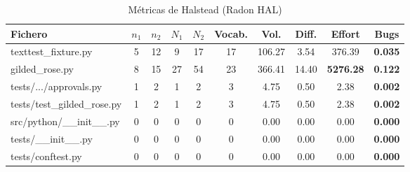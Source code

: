 \documentclass{article}
\newcommand{\good}[1]{\textbf{\textcolor{metGood}{#1}}}
\newcommand{\medium}[1]{\textbf{\textcolor{metMedium}{#1}}}
\newcommand{\bad}[1]{\textbf{\textcolor{metBad}{#1}}}
\begin{document}
\begin{table}[H]
    \centering
    \small
    \setlength{\tabcolsep}{4pt}
    \begin{tabular}{lcccccccc c}
        \toprule
        \textbf{Fichero}            & \textbf{$n_1$} & \textbf{$n_2$} & \textbf{$N_1$} & \textbf{$N_2$} & \textbf{Vocab.} & \textbf{Vol.} & \textbf{Diff.} & \textbf{Effort} & \textbf{Bugs}  \\
        \midrule
        texttest\_fixture.py        & 5              & 12             & 9              & 17             & 17              & 106.27        & 3.54           & 376.39          & \good{0.035}   \\
        gilded\_rose.py             & 8              & 15             & 27             & 54             & 23              & 366.41        & 14.40          & \bad{5276.28}   & \medium{0.122} \\
        tests/.../approvals.py      & 1              & 2              & 1              & 2              & 3               & 4.75          & 0.50           & 2.38            & \good{0.002}   \\
        tests/test\_gilded\_rose.py & 1              & 2              & 1              & 2              & 3               & 4.75          & 0.50           & 2.38            & \good{0.002}   \\
        src/python/\_\_init\_\_.py  & 0              & 0              & 0              & 0              & 0               & 0.00          & 0.00           & 0.00            & \good{0.000}   \\
        tests/\_\_init\_\_.py       & 0              & 0              & 0              & 0              & 0               & 0.00          & 0.00           & 0.00            & \good{0.000}   \\
        tests/conftest.py           & 0              & 0              & 0              & 0              & 0               & 0.00          & 0.00           & 0.00            & \good{0.000}   \\
        \bottomrule
    \end{tabular}
    \caption{Métricas de Halstead (Radon HAL)}
    \label{tab:radon_hal}
\end{table}
\end{document}
